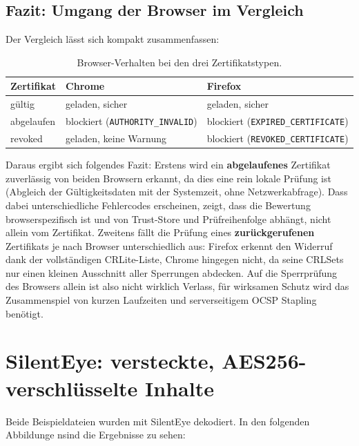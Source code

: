 \documentclass[11pt,a4paper]{article}
\begin{document}
\subsection{Fazit: Umgang der Browser im Vergleich}
Der Vergleich lässt sich kompakt zusammenfassen:
\begin{table}[H]
  \centering
  \small
  \begin{tabular}{lll}
    \textbf{Zertifikat} & \textbf{Chrome} & \textbf{Firefox} \\
    \hline
    gültig     & geladen, sicher                         & geladen, sicher \\
    abgelaufen & blockiert (\texttt{AUTHORITY\_INVALID}) & blockiert (\texttt{EXPIRED\_CERTIFICATE}) \\
    revoked    & geladen, keine Warnung                  & blockiert (\texttt{REVOKED\_CERTIFICATE}) \\
  \end{tabular}
  \caption{Browser-Verhalten bei den drei Zertifikatstypen.}
  \label{tab:c-vergleich}
\end{table}

Daraus ergibt sich folgendes Fazit: Erstens wird ein \textbf{abgelaufenes} Zertifikat zuverlässig von beiden Browsern erkannt, da dies eine rein lokale Prüfung ist (Abgleich der Gültigkeitsdaten mit der Systemzeit, ohne Netzwerkabfrage). Dass dabei unterschiedliche Fehlercodes erscheinen, zeigt, dass die Bewertung browserspezifisch ist und von Trust-Store und Prüfreihenfolge abhängt, nicht allein vom Zertifikat. Zweitens fällt die Prüfung eines \textbf{zurückgerufenen} Zertifikats je nach Browser unterschiedlich aus: Firefox erkennt den Widerruf dank der vollständigen CRLite-Liste, Chrome hingegen nicht, da seine CRLSets nur einen kleinen Ausschnitt aller Sperrungen abdecken. Auf die Sperrprüfung des Browsers allein ist also nicht wirklich Verlass, für wirksamen Schutz wird das Zusammenspiel von kurzen Laufzeiten und serverseitigem OCSP Stapling benötigt.

\section{SilentEye: versteckte, AES256-verschlüsselte Inhalte}
Beide Beispieldateien wurden mit SilentEye dekodiert. In den folgenden Abbildunge nsind die Ergebnisse zu sehen:
\end{document}
